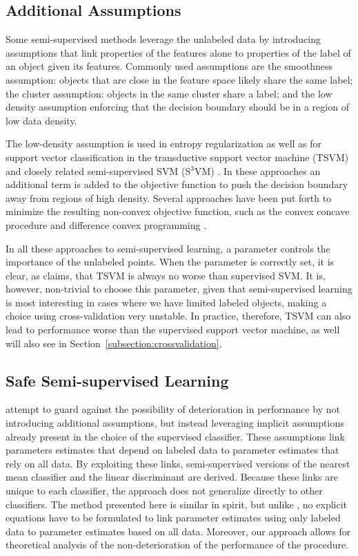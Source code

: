 \documentclass[twoside]{memoir}\usepackage[]{graphicx}\usepackage{xcolor}
\begin{document}
\subsection*{Additional Assumptions}
Some semi-supervised methods leverage the unlabeled data by introducing assumptions that link properties of the features alone to properties of the label of an object given its features. Commonly used assumptions are the smoothness assumption: objects that are close in the feature space likely share the same label; the cluster assumption: objects in the same cluster share a label; and the low density assumption enforcing that the decision boundary should be in a region of low data density. 

The low-density assumption is used in entropy regularization \citep{Grandvalet2005} as well as for support vector classification in the transductive support vector machine (TSVM)  \citep{Joachims1999} and closely related semi-supervised SVM (S$^3$VM) \citep{Bennett1998,Sindhwani2006}. 
In these approaches an additional term is added to the objective function to push the decision boundary away from regions of high density. 
Several approaches have been put forth to minimize the resulting non-convex objective function, such as the convex concave procedure \citep{Collobert2006} and difference convex programming \citep{Sindhwani2006,Wang2007}.

In all these approaches to semi-supervised learning, a parameter controls the importance of the unlabeled points. When the parameter is correctly set, it is clear, as \citet{Wang2007a} claims, that TSVM is always no worse than supervised SVM. 
It is, however, non-trivial to choose this parameter, given that semi-supervised learning is most interesting in cases where we have limited labeled objects, making a choice using cross-validation very unstable. 
In practice, therefore, TSVM can also lead to performance worse than the supervised support vector machine, as well will also see in Section~\ref{subsection:crossvalidation}.

\subsection*{Safe Semi-supervised Learning}
\citet{Loog2010,Loog2014b} attempt to guard against the possibility of deterioration in performance by not introducing additional assumptions, but instead leveraging implicit assumptions already present in the choice of the supervised classifier.
These assumptions link parameters estimates that depend on labeled data to parameter estimates that rely on all data. 
By exploiting these links, semi-supervised versions of the nearest mean classifier and the linear discriminant are derived. 
Because these links are unique to each classifier, the approach does not generalize directly to other classifiers. 
The method presented here is similar in spirit, but unlike \citep{Loog2010,Loog2014b}, no explicit equations have to be formulated to link parameter estimates using only labeled data to parameter estimates based on all data. Moreover, our approach allows for theoretical analysis of the non-deterioration of the performance of the procedure.
\end{document}
